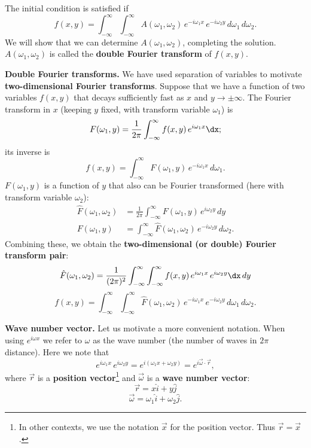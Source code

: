 The initial condition is satisfied if
\[
f(x,y) = \int_{-\infty}^{\infty}\int_{-\infty}^{\infty}A(\omega_1,\omega_2)\,e^{-i\omega_1 x}\,e^{-i\omega_2 y}\,d\omega_1\,d\omega_2.
\]
We will show that we can determine $A(\omega_1,\omega_2)$,
completing the solution.  $A(\omega_1,\omega_2)$ is called the \textbf{double Fourier transform} of $f(x,y)$.

\textbf{Double Fourier transforms.}  We have used separation of variables to motivate \textbf{two-dimensional Fourier transforms}.  Suppose that we have a function of two variables $f(x,y)$ that decays sufficiently fast as $x$ and $y \to \pm\infty$.  The Fourier transform in $x$ (keeping $y$ fixed, with transform variable $\omega_1$) is
\[
F(\omega_1,y) = \frac{1}{2\pi}\int_{-\infty}^{\infty}f(x,y)\,e^{i\omega_1 x}\dx;
\]
its inverse is
\[
f(x,y) = \int_{-\infty}^{\infty}F(\omega_1,y)\,e^{-i\omega_1 x}\,d\omega_1.
\]
$F(\omega_1,y)$ is a function of $y$ that also can be Fourier transformed (here with transform variable $\omega_2$):
\begin{align*}
\hat{F}(\omega_1,\omega_2) &= \frac{1}{2\pi}\int_{-\infty}^{\infty}F(\omega_1,y)\,e^{i\omega_2 y}\,dy \\
F(\omega_1,y) &= \int_{-\infty}^{\infty}\hat{F}(\omega_1,\omega_2)\,e^{-i\omega_2 y}\,d\omega_2.
\end{align*}
Combining these, we obtain the \textbf{two-dimensional (or double) Fourier transform pair}:
\begin{equation}
\label{eq:double-ft-forward}
\hat{F}(\omega_1,\omega_2) = \frac{1}{(2\pi)^2}\int_{-\infty}^{\infty}\int_{-\infty}^{\infty}f(x,y)\,e^{i\omega_1 x}\,e^{i\omega_2 y}\dx\,dy
\end{equation}
\begin{equation}
\label{eq:double-ft-inverse}
f(x,y) = \int_{-\infty}^{\infty}\int_{-\infty}^{\infty}\hat{F}(\omega_1,\omega_2)\,e^{-i\omega_1 x}\,e^{-i\omega_2 y}\,d\omega_1\,d\omega_2.
\end{equation}

\textbf{Wave number vector.}  Let us motivate a more convenient notation.  When using $e^{i\omega x}$ we refer to $\omega$ as the wave number (the number of waves in $2\pi$ distance).  Here we note that
\[
e^{i\omega_1 x}\,e^{i\omega_2 y} = e^{i(\omega_1 x + \omega_2 y)} = e^{i\vec{\omega}\cdot\vec{r}},
\]
where $\vec{r}$ is a \textbf{position vector}\footnote{In other contexts, we use the notation $\vec{x}$ for the position vector.  Thus $\vec{r} = \vec{x}$.} and $\vec{\omega}$ is a \textbf{wave number vector}:
\begin{equation}
\label{eq:position-vec}
\vec{r} = x\hat{i} + y\hat{j}
\end{equation}
\begin{equation}
\label{eq:wavenumber-vec}
\vec{\omega} = \omega_1\hat{i} + \omega_2\hat{j}.
\end{equation}

